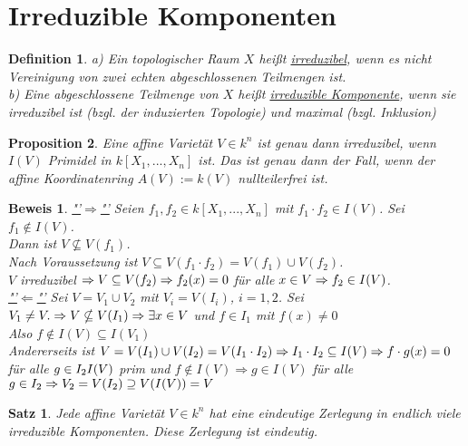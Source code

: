 \documentclass[a4paper,12pt]{report}
\theoremstyle{break}
\newtheorem{Satz}{Satz}
\newtheorem{Def}{Definition}[chapter]
\newtheorem{Prop}[Def]{Proposition}
\theoremstyle{nonumberbreak}
\newtheorem{Bew}{Beweis}
\theoremstyle{nonumberplain}
\begin{document}
\section{Irreduzible Komponenten}
\begin{Def}
a) Ein topologischer Raum $X$ heißt \underline{irreduzibel}, wenn es nicht Vereinigung von zwei echten abgeschlossenen Teilmengen ist.\\
b) Eine abgeschlossene Teilmenge von $X$ heißt \underline{irreduzible Komponente}, wenn sie irreduzibel ist (bzgl. der induzierten Topologie) und maximal (bzgl. Inklusion)
\end{Def}
\begin{Prop}
Eine affine Varietät $V\in k^n$ ist genau dann irreduzibel, wenn $I(V)$ Primidel in $k[X_1,...,X_n]$ ist. Das ist genau dann der Fall, wenn der affine Koordinatenring $A(V):=k(V)$ nullteilerfrei ist.
\end{Prop}
\begin{Bew}
\underline{"'$\Rightarrow$"'} Seien $f_1, f_2\in k[X_1,...,X_n]$ mit $f_1\cdot f_2\in I(V)$. Sei $f_1\notin I(V)$.\\
Dann ist $V\nsubseteq V(f_1)$. \\
Nach Voraussetzung ist $V\subseteq V(f_1\cdot f_2)= V(f_1)\cup V(f_2)$.\\
$V$ irreduzibel $\Rightarrow V\subseteq V(f_2)\\
\Rightarrow f_2(x)=0$ für alle $x\in V\\
\Rightarrow f_2\in I(V)$.\\
\underline{"'$\Leftarrow$"'} Sei $V=V_1\cup V_2$ mit $V_i=V(I_i)$, $i=1,2$. Sei $V_1 \neq V.\\
\Rightarrow V \nsubseteq V(I_1)\\
\Rightarrow \exists x \in V$ und $f\in I_1$ mit $f(x)\neq 0$\\
Also $f\notin I(V)\subseteq I(V_1)$\\
Andererseits ist $V=V(I_1)\cup V(I_2)= V(I_1\cdot I_2)\Rightarrow I_1\cdot I_2\subseteq I(V)\\
\Rightarrow f\cdot g(x)=0$ für alle $g\in I_2\\
I(V)$ prim und $f\notin I(V)\Rightarrow g\in I(V)$ für alle $g\in I_2\\
\Rightarrow V_2 = V(I_2)\supseteq V(I(V))=V$
\end{Bew}
\begin{Satz}
Jede affine Varietät $V\in k^n$ hat eine eindeutige Zerlegung in endlich viele irreduzible Komponenten. Diese Zerlegung ist eindeutig. 
\end{Satz}
\end{document}

